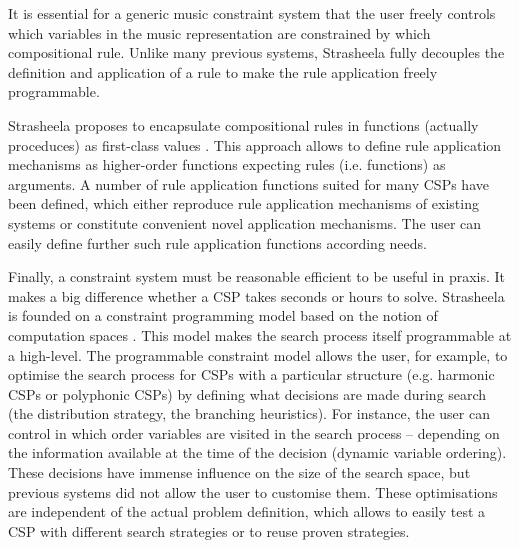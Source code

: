 \documentclass{scrartcl}
\begin{document}
It is essential for a generic music constraint system that the user freely controls which variables in the music representation are constrained by which compositional rule. Unlike many previous systems, Strasheela fully decouples the definition and application of a rule to make the rule application freely programmable.

Strasheela proposes to encapsulate compositional rules in functions (actually proceduces) as first-class values \citep{AbelsonAndSussman:SICP:1985}. This approach allows to define rule application mechanisms as higher-order functions expecting rules (i.e. functions) as arguments. A number of rule application functions suited for many CSPs have been defined, which either reproduce rule application mechanisms of existing systems or constitute convenient novel application mechanisms. The user can easily define further such rule application functions according needs. %


Finally, a constraint system must be reasonable efficient to be useful in praxis. It makes a big difference whether a CSP takes seconds or hours to solve. 
Strasheela is founded on a constraint programming model based on the notion of computation spaces \citep{Schulte:Book:2002}. This model makes the search process itself programmable at a high-level. 
%
The programmable constraint model allows the user, for example, to optimise the search process for CSPs with a particular structure (e.g. harmonic CSPs or polyphonic CSPs) by defining what decisions are made during search (the distribution strategy, the branching heuristics). For instance, the user can control in which order variables are visited in the search process -- depending on the information available at the time of the decision (dynamic variable ordering). These decisions have immense influence on the size of the search space, but previous systems did not allow the user to customise them.
These optimisations are independent of the actual problem definition, which allows to easily test a CSP with different search strategies or to reuse proven strategies.
\end{document}
